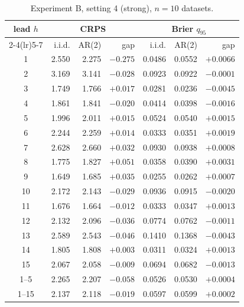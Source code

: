\documentclass[11pt]{article}
\begin{document}
\begin{table}[ht]
\centering
\caption{Experiment B, setting 4 (strong), $n = 10$ datasets.}
\label{tab:expB4}
\small
\begin{tabular}{crrrrrr}
\toprule
lead $h$ & \multicolumn{3}{c}{CRPS} & \multicolumn{3}{c}{Brier $q_{95}$} \\
\cmidrule(lr){2-4}\cmidrule(lr){5-7}
 & i.i.d. & AR(2) & gap & i.i.d. & AR(2) & gap \\
\midrule
1 & 2.550 & 2.275 & $-0.275$ & 0.0486 & 0.0552 & $+0.0066$ \\
2 & 3.169 & 3.141 & $-0.028$ & 0.0923 & 0.0922 & $-0.0001$ \\
3 & 1.749 & 1.766 & $+0.017$ & 0.0281 & 0.0236 & $-0.0045$ \\
4 & 1.861 & 1.841 & $-0.020$ & 0.0414 & 0.0398 & $-0.0016$ \\
5 & 1.996 & 2.011 & $+0.015$ & 0.0524 & 0.0540 & $+0.0015$ \\
6 & 2.244 & 2.259 & $+0.014$ & 0.0333 & 0.0351 & $+0.0019$ \\
7 & 2.628 & 2.660 & $+0.032$ & 0.0930 & 0.0938 & $+0.0008$ \\
8 & 1.775 & 1.827 & $+0.051$ & 0.0358 & 0.0390 & $+0.0031$ \\
9 & 1.649 & 1.685 & $+0.035$ & 0.0255 & 0.0262 & $+0.0007$ \\
10 & 2.172 & 2.143 & $-0.029$ & 0.0936 & 0.0915 & $-0.0020$ \\
11 & 1.676 & 1.664 & $-0.012$ & 0.0333 & 0.0347 & $+0.0013$ \\
12 & 2.132 & 2.096 & $-0.036$ & 0.0774 & 0.0762 & $-0.0011$ \\
13 & 2.589 & 2.543 & $-0.046$ & 0.1410 & 0.1368 & $-0.0043$ \\
14 & 1.805 & 1.808 & $+0.003$ & 0.0311 & 0.0324 & $+0.0013$ \\
15 & 2.067 & 2.058 & $-0.009$ & 0.0694 & 0.0682 & $-0.0013$ \\
\midrule
1--5 & 2.265 & 2.207 & $-0.058$ & 0.0526 & 0.0530 & $+0.0004$ \\
1--15 & 2.137 & 2.118 & $-0.019$ & 0.0597 & 0.0599 & $+0.0002$ \\
\bottomrule
\end{tabular}
\end{table}
\end{document}
